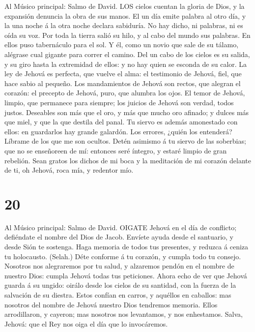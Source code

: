  Al Músico principal: Salmo de David. LOS cielos cuentan la
gloria de Dios, y la expansión denuncia la obra de sus manos.
 El un día emite palabra al otro día, y la una noche á la
otra noche declara sabiduría.  No hay dicho, ni palabras, ni
es oída su voz.  Por toda la tierra salió su hilo, y al cabo
del mundo sus palabras. En ellos puso tabernáculo para el sol.
 Y él, como un novio que sale de su tálamo, alégrase cual
gigante para correr el camino.  Del un cabo de los cielos es
su salida, y su giro hasta la extremidad de ellos: y no hay quien se
esconda de su calor.  La ley de Jehová es perfecta, que
vuelve el alma: el testimonio de Jehová, fiel, que hace sabio al
pequeño.  Los mandamientos de Jehová son rectos, que alegran
el corazón: el precepto de Jehová, puro, que alumbra los ojos.
 El temor de Jehová, limpio, que permanece para siempre; los
juicios de Jehová son verdad, todos justos.  Deseables son
más que el oro, y más que mucho oro afinado; y dulces más que miel, y
que la que destila del panal.  Tu siervo es además
amonestado con ellos: en guardarlos hay grande galardón. 
Los errores, ¿quién los entenderá? Líbrame de los que me son ocultos.
 Detén asimismo á tu siervo de las soberbias; que no se
enseñoreen de mí: entonces seré íntegro, y estaré limpio de gran
rebelión.  Sean gratos los dichos de mi boca y la
meditación de mi corazón delante de ti, oh Jehová, roca mía, y redentor
mío.

\hypertarget{section-19}{%
\section{20}\label{section-19}}

 Al Músico principal: Salmo de David. OIGATE Jehová en el
día de conflicto; defiéndate el nombre del Dios de Jacob. 
Envíete ayuda desde el santuario, y desde Sión te sostenga. 
Haga memoria de todos tus presentes, y reduzca á ceniza tu holocausto.
(Selah.)  Déte conforme á tu corazón, y cumpla todo tu
consejo.  Nosotros nos alegraremos por tu salud, y alzaremos
pendón en el nombre de nuestro Dios: cumpla Jehová todas tus peticiones.
 Ahora echo de ver que Jehová guarda á su ungido: oirálo
desde los cielos de su santidad, con la fuerza de la salvación de su
diestra.  Estos confían en carros, y aquéllos en caballos:
mas nosotros del nombre de Jehová nuestro Dios tendremos memoria.
 Ellos arrodillaron, y cayeron; mas nosotros nos levantamos,
y nos enhestamos.  Salva, Jehová: que el Rey nos oiga el día
que lo invocáremos.

